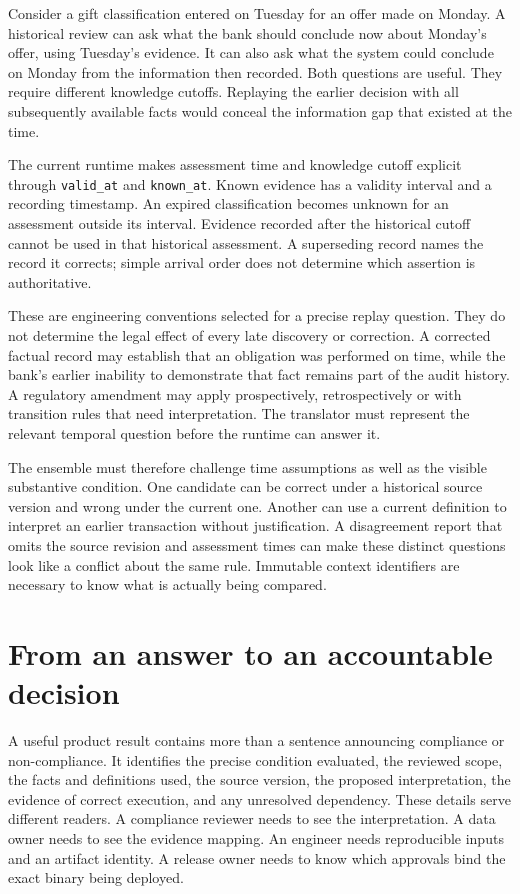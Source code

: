 \documentclass[12pt,a4paper,oneside,openany]{book}
\begin{document}
Consider a gift classification entered on Tuesday for an offer made on Monday.
A historical review can ask what the bank should conclude now about Monday's
offer, using Tuesday's evidence. It can also ask what the system could conclude
on Monday from the information then recorded. Both questions are useful. They
require different knowledge cutoffs. Replaying the earlier decision with all
subsequently available facts would conceal the information gap that existed at
the time.

The current runtime makes assessment time and knowledge cutoff explicit through
\texttt{valid\_at} and \texttt{known\_at}. Known evidence has a validity interval
and a recording timestamp. An expired classification becomes unknown for an
assessment outside its interval. Evidence recorded after the historical cutoff
cannot be used in that historical assessment. A superseding record names the
record it corrects; simple arrival order does not determine which assertion is
authoritative.

These are engineering conventions selected for a precise replay question. They
do not determine the legal effect of every late discovery or correction. A
corrected factual record may establish that an obligation was performed on time,
while the bank's earlier inability to demonstrate that fact remains part of the
audit history. A regulatory amendment may apply prospectively, retrospectively or
with transition rules that need interpretation. The translator must represent
the relevant temporal question before the runtime can answer it.

The ensemble must therefore challenge time assumptions as well as the visible
substantive condition. One candidate can be correct under a historical source
version and wrong under the current one. Another can use a current definition
to interpret an earlier transaction without justification. A disagreement report
that omits the source revision and assessment times can make these distinct
questions look like a conflict about the same rule. Immutable context identifiers
are necessary to know what is actually being compared.

\section{From an answer to an accountable decision}
\label{sec:problem-accountability}
A useful product result contains more than a sentence announcing compliance or
non-compliance. It identifies the precise condition evaluated, the reviewed scope,
the facts and definitions used, the source version, the proposed interpretation,
the evidence of correct execution, and any unresolved dependency. These details
serve different readers. A compliance reviewer needs to see the interpretation.
A data owner needs to see the evidence mapping. An engineer needs reproducible
inputs and an artifact identity. A release owner needs to know which approvals
bind the exact binary being deployed.
\end{document}
